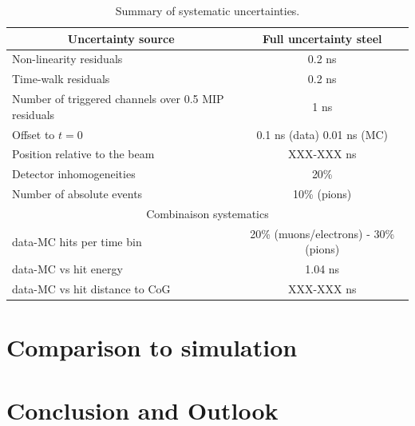 {
\renewcommand{\arraystretch}{1.2}
\begin{table}[htb!]
	\centering
	\caption{Summary of systematic uncertainties.}
	\label{table:time_syst}
	\begin{tabular}{@{} |l|c| @{}}
		\hline
		\multicolumn{1}{|c|}{Uncertainty source} & Full uncertainty steel \\
		\hline
		Non-linearity residuals & 0.2 ns \\
		Time-walk residuals & 0.2 ns \\
		Number of triggered channels over 0.5 MIP residuals & 1 ns \\
		Offset to $t=0$ & 0.1 ns (data) 0.01 ns (MC) \\
		Position relative to the beam & XXX-XXX ns \\
		Detector inhomogeneities & 20\% \\
		Number of absolute events & 10\% (pions) \\
		\hline
		\hline
		\multicolumn{2}{|c|}{Combinaison systematics} \\
		\hline
		data-MC hits per time bin & 20\% (muons/electrons) - 30\% (pions) \\
		data-MC vs hit energy & 1.04 ns \\
		data-MC vs hit distance to CoG & XXX-XXX ns \\
		\hline
	\end{tabular}
\end{table}
}

\section{Comparison to simulation}

\section{Conclusion and Outlook}
